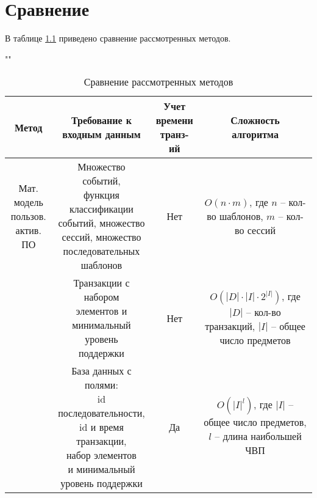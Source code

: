 \chapter{Сравнение}
\label{cha:research}

В таблице \ref{tab} приведено сравнение рассмотренных методов.

\begin{table}[H]
	\begin{center}
		\caption{Сравнение рассмотренных методов}
		\label{tab}
		""\newline
		\begin{tabular}{ | c | c | c | c | }
			\hline
			Метод & \specialcell{Требование к\\ входным данным}  & \specialcell{Учет\\времени \\транз-ий} & \specialcell{Сложность\\алгоритма} \\ \hline
			
			\specialcell{Мат. модель\\пользов.\\актив. ПО} & \specialcell{Множество событий,\\функция классификации\\событий, множество\\сессий, множество\\последовательных\\шаблонов} & Нет & \specialcell{$O(n \cdot m)$, где $n$ --\\кол-во шаблонов,\\$m$ -- кол-во сессий} \\ \hline
			
			\specialcell{Apriori} & \specialcell{Транзакции с набором\\элементов и\\минимальный уровень\\поддержки} & Нет & \specialcell{$O(|D| \cdot |I| \cdot 2^{|I|})$,\\где $|D|$ -- кол-во\\транзакций,\\$|I|$ -- общее число\\предметов} \\ \hline
			
			\specialcell{GSP} & \specialcell{База данных с полями:\\id последовательности,\\id и время транзакции,\\набор элементов\\и минимальный\\уровень поддержки} & Да & \specialcell{$O(|I|^l)$, где $|I|$ --\\общее число\\предметов,\\$l$ -- длина\\наибольшей ЧВП} \\ \hline
			

\end{tabular}
\end{center}
\end{table}
